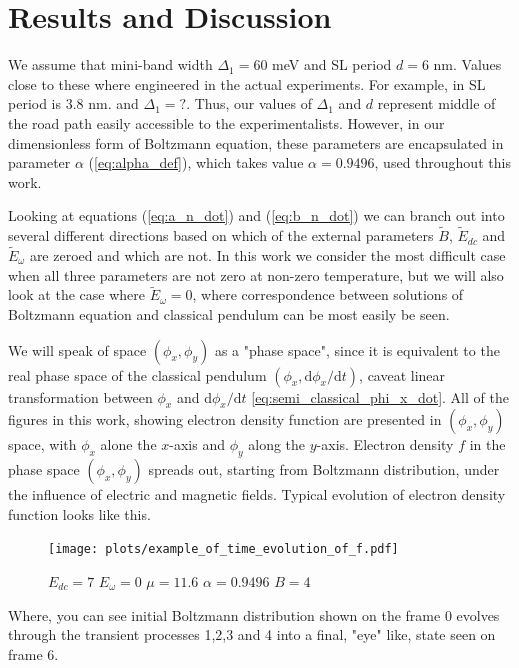 \documentclass[40pt,letterpaper,physrev]{article}
\begin{document}
    \section{Results and Discussion}
    We assume that mini-band width $\Delta_1=60$ meV and SL period $d=6$ nm. Values close to these where engineered
    in the actual experiments. For example, in \cite{PhysRevB.56.10303} SL period is $3.8$ nm. and $\Delta_1=?$. 
    Thus, our values of $\Delta_1$ and $d$ represent middle of the road path easily accessible to the
    experimentalists. However, in our dimensionless form of Boltzmann equation, these parameters are encapsulated
    in parameter $\alpha$ (\ref{eq:alpha_def}), which takes value $\alpha=0.9496$, used throughout this work. 
    
    Looking at equations (\ref{eq:a_n_dot}) and (\ref{eq:b_n_dot}) we can branch out into several different 
    directions based on which of the external parameters $\tilde{B}$, $\tilde{E}_{dc}$ and $\tilde{E}_\omega$ 
    are zeroed and which are not. In this work we consider the most difficult case when all three parameters
    are not zero at non-zero temperature, but we will also look at the case where $\tilde{E}_\omega=0$, where
    correspondence between solutions of Boltzmann equation and classical pendulum can be most easily be seen.
    
    We will speak of space $(\phi_x,\phi_y)$ as a "phase space", since it is equivalent to the real phase space of 
    the classical pendulum $(\phi_x,\text{d}\phi_x/\text{d}t)$, caveat linear transformation between $\phi_x$ and 
    $\text{d}\phi_x/\text{d}t$ \ref{eq:semi_classical_phi_x_dot}. All of the figures in this work, showing electron 
    density function are presented in $(\phi_x,\phi_y)$ space, with $\phi_x$ alone the $x$-axis and $\phi_y$ along
    the $y$-axis. Electron density $f$ in the phase space $(\phi_x,\phi_y)$ spreads out, starting from Boltzmann 
    distribution, under the influence of electric and magnetic fields. Typical evolution of electron density function
    looks like this.
    \begin{figure}[H]
   	  \centering
	  \normalsize %
	  \texttt{[image: plots/example\_of\_time\_evolution\_of\_f.pdf]}
	  \label{fig:example_of_time_evolution_of_f}
	  \caption{$E_{dc}=7$ $E_\omega=0$ $\mu=11.6$ $\alpha=0.9496$ $B=4$}
	\end{figure}
	Where, you can see initial Boltzmann distribution shown on the frame 0 evolves through the transient 
	processes 1,2,3 and 4 into a final, "eye" like, state seen on frame 6.
	
\end{document}
